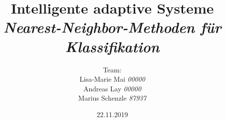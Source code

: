 

\title{\textbf{Intelligente adaptive Systeme}\\\textit{Nearest-Neighbor-Methoden für Klassifikation}}
\author{Team:\\Lisa-Marie Mai \textit{00000}\\Andreas Lay \textit{00000}\\Marius Schenzle \textit{87937} \vspace{10px}}
\date{22.11.2019}


\doublespacing
{}
\maketitle
\newpage
\tableofcontents
\newpage
\singlespacing
{}


\newpage


\newpage


\newpage


\newpage





